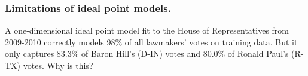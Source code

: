 

\subsubsection{Limitations of ideal point models.}

A one-dimensional ideal point model fit to the House of
Representatives from 2009-2010 correctly models 98\% of all lawmakers'
votes on training data. But it only captures 83.3\% of Baron Hill's
(D-IN) votes and 80.0\% of Ronald Paul's (R-TX) votes.  Why is this?

